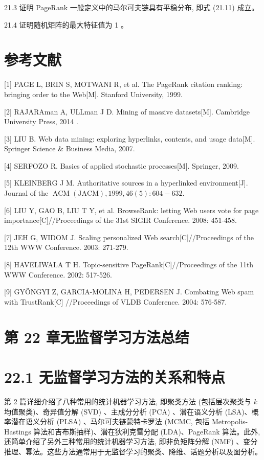 \documentclass[10pt]{article}
\begin{document}
\begin{CJK*}{UTF8}{bsmi}
21.3 证明 PageRank 一般定义中的马尔可夫链具有平稳分布, 即式 (21.11) 成立。

21.4 证明随机矩阵的最大特征值为 1 。

\section*{参考文献}
[1] PAGE L, BRIN S, MOTWANI R, et al. The PageRank citation ranking: bringing order to the Web[M]. Stanford University, 1999.

[2] RAJARAman A, ULLman J D. Mining of massive datasets[M]. Cambridge University Press, 2014 .

[3] LIU B. Web data mining: exploring hyperlinks, contents, and usage data[M]. Springer Science \& Business Media, 2007.

[4] SERFOZO R. Basics of applied stochastic processes[M]. Springer, 2009.

[5] KLEINBERG J M. Authoritative sources in a hyperlinked environment[J]. Journal of the $\operatorname{ACM}(\mathrm{JACM}), 1999,46(5): 604-632$.

[6] LIU Y, GAO B, LIU T Y, et al. BrowseRank: letting Web users vote for page importance[C]//Proceedings of the 31st SIGIR Conference. 2008: 451-458.

[7] JEH G, WIDOM J. Scaling personalized Web search[C]//Proceedings of the 12th WWW Conference. 2003: 271-279.

[8] HAVELIWALA T H. Topic-sensitive PageRank[C]//Proceedings of the 11th WWW Conference. 2002: 517-526.

[9] GYÖNGYI Z, GARCIA-MOLINA H, PEDERSEN J. Combating Web spam with TrustRank[C] //Proceedings of VLDB Conference. 2004: 576-587.

\section*{第 22 章无监督学习方法总结}
\section*{22.1 无监督学习方法的关系和特点}
第 2 篇详细介绍了八种常用的统计机器学习方法, 即聚类方法 (包括层次聚类与 $k$ 均值聚类)、奇异值分解 (SVD) 、主成分分析 (PCA) 、潜在语义分析 (LSA)、概率潜在语义分析 (PLSA) 、马尔可夫链蒙特卡罗法 (MCMC, 包括 Metropolis-Hastings 算法和吉布斯抽样)、潜在狄利克雷分配 (LDA)、PageRank 算法。此外, 还简单介绍了另外三种常用的统计机器学习方法, 即非负矩阵分解 (NMF) 、变分推理、幂法。这些方法通常用于无监督学习的聚类、降维、话题分析以及图分析。


\end{CJK*}
\end{document}
